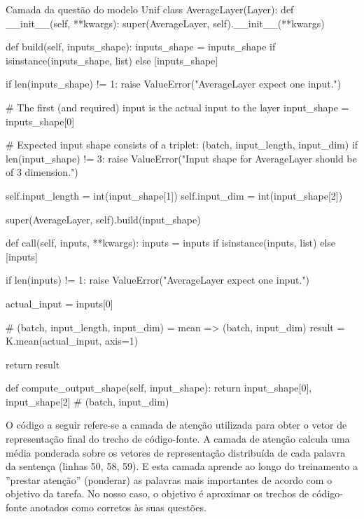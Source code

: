 \begin{mypython-linenumber}{Camada da questão do modelo Unif}
class AverageLayer(Layer):
    def __init__(self, **kwargs):
        super(AverageLayer, self).__init__(**kwargs)

    def build(self, inputs_shape):
        inputs_shape = inputs_shape if isinstance(inputs_shape, list) else [inputs_shape]

        if len(inputs_shape) != 1:
            raise ValueError("AverageLayer expect one input.")

        # The first (and required) input is the actual input to the layer
        input_shape = inputs_shape[0]

        # Expected input shape consists of a triplet: (batch, input_length, input_dim)
        if len(input_shape) != 3:
            raise ValueError("Input shape for AverageLayer should be of 3 dimension.")

        self.input_length = int(input_shape[1])
        self.input_dim = int(input_shape[2])

        super(AverageLayer, self).build(input_shape)

    def call(self, inputs, **kwargs):
        inputs = inputs if isinstance(inputs, list) else [inputs]

        if len(inputs) != 1:
            raise ValueError("AverageLayer expect one input.")

        actual_input = inputs[0]

        # (batch, input_length, input_dim) = mean => (batch, input_dim)
        result = K.mean(actual_input, axis=1)

        return result

    def compute_output_shape(self, input_shape):
        return input_shape[0], input_shape[2] # (batch, input_dim)
\end{mypython-linenumber}

\vspace{2cm}

O código a seguir refere-se a camada de atenção utilizada para obter o vetor de representação final do trecho de código-fonte. A camada de atenção calcula uma média ponderada sobre os vetores de representação distribuída de cada palavra da sentença (linhas 50, 58, 59). E esta camada aprende ao longo do treinamento a ''prestar atenção'' (ponderar) as palavras mais importantes de acordo com o objetivo da tarefa. No nosso caso, o objetivo é aproximar os trechos de código-fonte anotados como corretos às suas questões.

